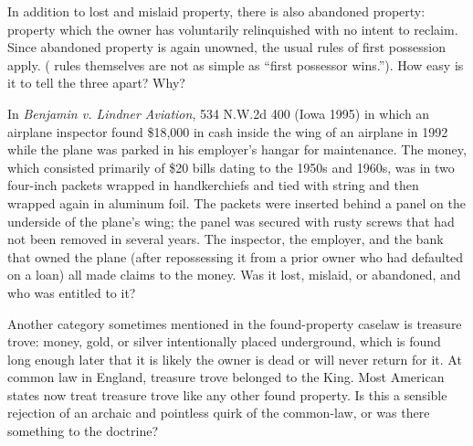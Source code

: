 \item In addition to lost and mislaid property, there is also abandoned
property: property which the owner has voluntarily relinquished with no intent
to reclaim. Since abandoned property is again unowned, the usual rules of first
possession apply. ( rules themselves are not as simple
as ``first possessor wins.''). How easy is it to tell the three apart? Why?


\item In \textit{Benjamin v. Lindner Aviation}, 534 N.W.2d 400 (Iowa
1995)\textbf{} in which an airplane inspector found \$18,000 in cash inside the
wing of an airplane in 1992 while the plane was parked in his employer's hangar
for maintenance. The money, which consisted primarily of \$20 bills dating to
the 1950s and 1960s, was in two four-inch packets wrapped in handkerchiefs and
tied with string and then wrapped again in aluminum foil. The packets were
inserted behind a panel on the underside of the plane's wing; the panel was
secured with rusty screws that had not been removed in several years. The
inspector, the employer, and the bank that owned the plane (after repossessing
it from a prior owner who had defaulted on a loan) all made claims to the
money. Was it lost, mislaid, or abandoned, and who was entitled to it?


\item Another category sometimes mentioned in the found-property caselaw is
treasure trove: money, gold, or silver intentionally placed underground, which
is found long enough later that it is likely the owner is dead or will never
return for it. At common law in England, treasure trove belonged to the King.
Most American states now treat treasure trove like any other found property. Is
this a sensible rejection of an archaic and pointless quirk of the common-law,
or was there something to the doctrine?


